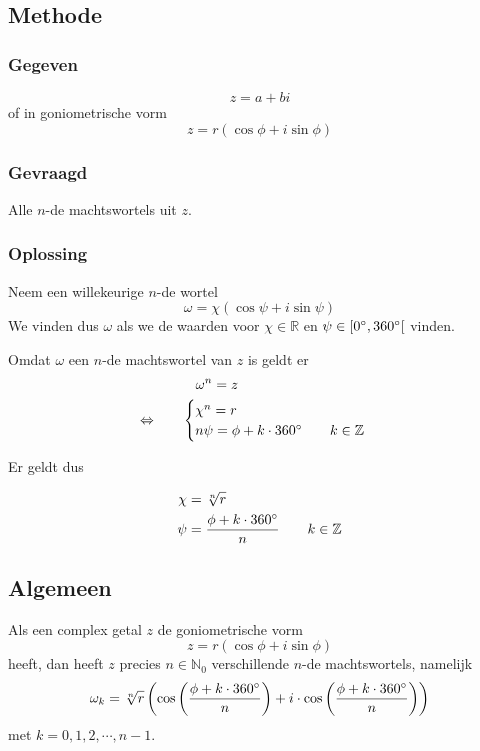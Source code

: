 \documentclass[12pt,twoside,a4]{article}
\begin{document}
\subsection{Methode}

\subsubsection*{Gegeven}
\[z=a+bi\]
of in goniometrische vorm
\[z=r(\cos\phi + i\sin\phi)\]

\subsubsection*{Gevraagd}
Alle $n$-de machtswortels uit $z$.

\subsubsection*{Oplossing}
Neem een willekeurige $n$-de wortel
\[\omega = \chi ( \cos \psi + i \sin \psi ) \]
We vinden dus $\omega$ als we de waarden voor $\chi\in\mathbb{R}$ en $\psi\in[0^\circ,360^\circ[$ vinden.

Omdat $\omega$ een $n$-de machtswortel van $z$ is geldt er
\begin{align*}
       & \quad \omega^n = z\\
  \Leftrightarrow \qquad & \begin{cases} \chi^n = r\\ n\psi = \phi + k \cdot 360^\circ \qquad k\in\mathbb{Z} \end{cases}
\end{align*}

Er geldt dus
\begin{mdframed}
  \begin{align*}
    \chi &= \sqrt[n]{r}\\
    \psi &= \dfrac{\phi + k \cdot 360^\circ}{n} \qquad k\in\mathbb{Z}
  \end{align*}
\end{mdframed}

\subsection{Algemeen}

Als een complex getal $z$ de goniometrische vorm
\[ z = r ( \cos \phi + i \sin \phi )\]
heeft, dan heeft $z$ precies $n\in\mathbb{N}_0$ verschillende $n$-de machtswortels, namelijk
\[ \omega_k = \sqrt[n]{r}\left( \cos\left( \dfrac{\phi + k \cdot 360^\circ}{n} \right) + i \cdot \cos\left( \dfrac{\phi + k \cdot 360^\circ}{n} \right) \right)\]
met $k = 0, 1, 2, \cdots , n-1$.
\end{document}
